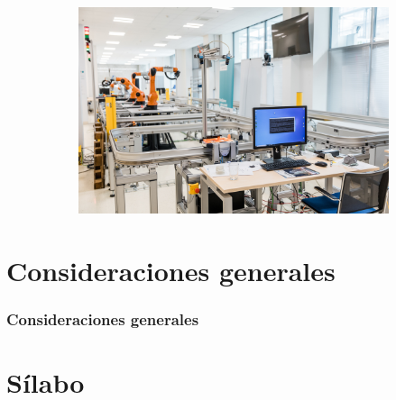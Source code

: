 \documentclass[xcolor=dvipsnames,envcountsect]{beamer}
\begin{document}
\begin{frame}
\begin{figure}
\begin{subfigure}[b]{0.3\textwidth}
     \end{subfigure}
     \vfill
     \begin{subfigure}[b]{0.2\textwidth}
         \centering
         \includegraphics[width=\textwidth]{Figures/ciirc.jpg}
     \end{subfigure}
\end{figure}



\end{frame}



\section{Consideraciones generales}
\begin{frame}
	\frametitle{Consideraciones generales}
		\justifying

\end{frame}






\section{ Sílabo}
\end{document}
